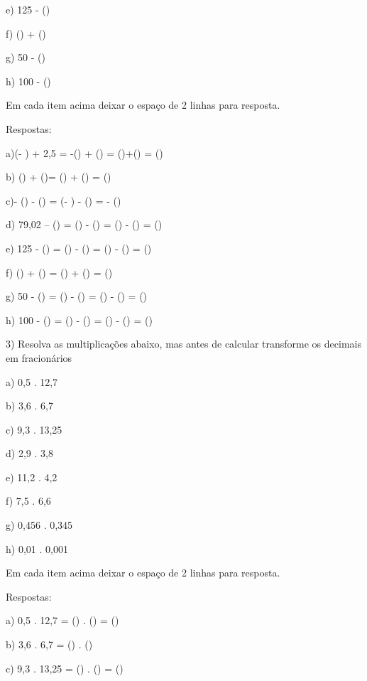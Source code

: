 e) 125 - ()

f) () + ()

g) 50 - ()

h) 100 - ()

Em cada item acima deixar o espaço de 2 linhas para resposta.

Respostas:

a)(- ) + 2,5 = -() + () =
()+() = ()

b) () + ()= () +
() = ()

c)- () - () = (- ) -
() = - ()

d) 79,02 -- () = () - ()
= () - () = ()

e) 125 - () = () - () =
() - () = ()

f) () + () = () +
() = ()

g) 50 - () = () - () =
() - () = ()

h) 100 - () = () - () =
() - () = ()

3) Resolva as multiplicações abaixo, mas antes de calcular transforme os
decimais em fracionários

a) 0,5 . 12,7

b) 3,6 . 6,7

c) 9,3 . 13,25

d) 2,9 . 3,8

e) 11,2 . 4,2

f) 7,5 . 6,6

g) 0,456 . 0,345

h) 0,01 . 0,001

Em cada item acima deixar o espaço de 2 linhas para resposta.

Respostas:

a) 0,5 . 12,7 = () . () =
()

b) 3,6 . 6,7 = () . ()

c) 9,3 . 13,25 = () . () =
()

